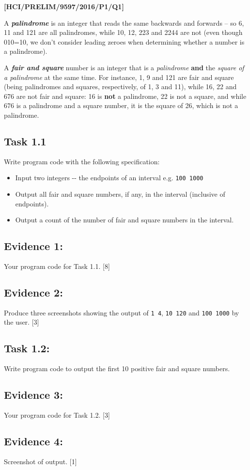 \item \textbf{{[}HCI/PRELIM/9597/2016/P1/Q1{]} }

A \textbf{\emph{palindrome}} is an integer that reads the same backwards
and forwards -- so 6, 11 and 121 are all palindromes, while 10, 12,
223 and 2244 are not (even though 010=10, we don't consider leading
zeroes when determining whether a number is a palindrome). 

A \textbf{\emph{fair and square}} number is an integer that is a \emph{palindrome}
\textbf{and} the \emph{square of a palindrome} at the same time. For
instance, 1, 9 and 121 are fair and square (being palindromes and
squares, respectively, of 1, 3 and 11), while 16, 22 and 676 are not
fair and square: 16 is \textbf{not} a palindrome, 22 is not a square,
and while 676 is a palindrome and a square number, it is the square
of 26, which is not a palindrome.

\subsection*{Task 1.1 }

Write program code with the following specification: 
\begin{itemize}
\item Input two integers -{}- the endpoints of an interval e.g. \texttt{100
1000 }
\item Output all fair and square numbers, if any, in the interval (inclusive
of endpoints). 
\item Output a count of the number of fair and square numbers in the interval.
\end{itemize}

\subsection*{Evidence 1: }

Your program code for Task 1.1.\hfill{} {[}8{]}

\subsection*{Evidence 2: }

Produce three screenshots showing the output of \texttt{1 4}, \texttt{10
120} and \texttt{100 1000} by the user.\hfill{} {[}3{]}

\subsection*{Task 1.2:}

Write program code to output the first 10 positive fair and square
numbers. 

\subsection*{Evidence 3: }

Your program code for Task 1.2.\hfill{} {[}3{]}

\subsection*{Evidence 4:}

Screenshot of output.\hfill{} {[}1{]}